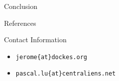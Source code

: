 \documentclass[final]{beamer}
\newlength{\onecolwid}
\begin{document}
\begin{frame}[t]
\begin{columns}[t]
\begin{column}{\onecolwid}
\begin{block}{Conclusion}
\end{block}


\begin{block}{References}

\nocite{*} %
\small{
\vspace{0.75in}}

\end{block}



\begin{alertblock}{Contact Information}
\begin{itemize}
  \item \texttt{jerome\{at\}dockes.org}
  \item \texttt{pascal.lu\{at\}centraliens.net}
\end{itemize}
\end{alertblock}


\end{column} %

\end{columns} %

\end{frame} %
\end{document}
